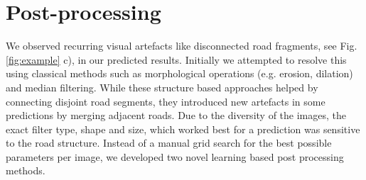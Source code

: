\section{Post-processing} \label{section:post}
We observed recurring visual artefacts like disconnected road fragments, see Fig. \ref{fig:example} c), in our predicted results. Initially we attempted to resolve this using classical methods such as morphological operations (e.g. erosion, dilation) and median filtering. While these structure based approaches helped by connecting disjoint road segments, they introduced new artefacts in some predictions by merging adjacent roads. Due to the diversity of the images, the exact filter type, shape and size, which worked best for a prediction was sensitive to the road structure. Instead of a manual grid search for the best possible parameters per image, we developed two novel learning based post processing methods.

